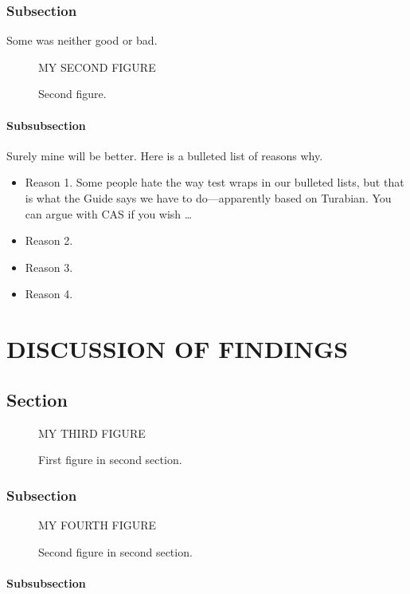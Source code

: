 \documentclass[12pt,econ]{authesis}
\begin{document}
\subsection{Subsection}

Some was neither good or bad.

\begin{figure}
\centering MY SECOND FIGURE
\caption{Second figure.}
\end{figure}


\subsubsection{Subsubsection}

Surely mine will be better.
Here is a bulleted list of reasons why.
\begin{itemize}
\item Reason 1.
Some people hate the way test wraps in our bulleted lists,
but that is what the Guide says we have to do---apparently based on Turabian.
You can argue with CAS if you wish \dots
\item Reason 2.
\item Reason 3.
\item Reason 4.
\end{itemize}


\chapter{DISCUSSION OF FINDINGS}


\section{Section}

\begin{figure}
\centering MY THIRD FIGURE
\caption{First figure in second section.}
\end{figure}



\subsection{Subsection}

\begin{figure}
\centering MY FOURTH FIGURE
\caption{Second figure in second section.}
\end{figure}


\subsubsection{Subsubsection}
\end{document}
